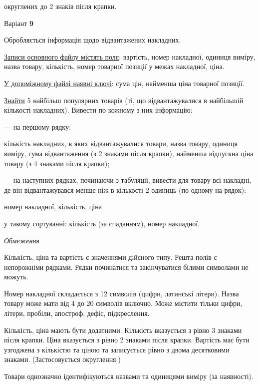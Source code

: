 \documentclass[11pt, ukrainian]{article}
\begin{document}
\bigskip
{\noindent} округлених до 2 знаків після крапки.


\par
\newpage
{\center Варіант  \No \textbf { 9 }\par}
\bigskip
Обробляється інформація щодо відвантажених накладних.

\underline{Записи основного файлу містять поля}: вартість, номер накладної, одиниця виміру, назва товару, кількість, номер товарної позиції у межах накладної, ціна.

\underline{У допоміжному файлі наявні ключі}: сума цін, найменша ціна товарної позиції.

\underline{Знайти} 5 найбільш популярних товарів (ті, що відвантажувалися в найбільшій кількості накладних). Вивести по кожному з них інформацію:\par
{\noindent}--- на першому рядку:\par
кількість накладних, в яких відвантажувалися товари, назва товару, одиниця виміру, сума відвантаження (з 2 знаками після крапки), найменша відпускна ціна товару (з 4 знаками після крапки);

{\noindent}--- на наступних рядках, починаючи з табуляції, вивести для товару всі накладні, де він відвантажувався менше ніж в кількості 2 одиниць (по одному на рядок):\par
номер накладної, кількість, ціна

{\noindent}у такому сортуванні: кількість (за спаданням), номер накладної.


\bigskip\textit{Обмеження}

Кількість, ціна та вартість є значеннями дійсного типу.
Решта полів є непорожніми рядками.
Рядки починатися та закінчуватися білими символами не можуть.

Номер накладної складається з 12 символів (цифри, латинські літери).
Назва товару може мати від 4 до 20 символів включно.
Може містити тільки цифри, літери, пробіли, апостроф, дефіс, підкреслення.

Кількість, ціна мають бути додатними.
Кількість вказується з рівно 3 знаками після крапки.
Ціна вказується з рівно 2 знаками після крапки.
Вартість має бути узгоджена з кількістю та ціною та записується рівно з двома десятковими знаками.
(Застосовується округлення.)

Товари однозначно ідентифікуються назвами та одиницями виміру (за наявності).
\end{document}
